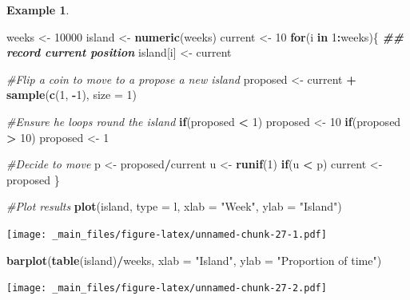 \documentclass[
]{book}
\newenvironment{Shaded}{\begin{snugshade}}{\end{snugshade}}
\newcommand{\AttributeTok}[1]{\textcolor[rgb]{0.13,0.29,0.53}{#1}}
\newcommand{\CommentTok}[1]{\textcolor[rgb]{0.56,0.35,0.01}{\textit{#1}}}
\newcommand{\ControlFlowTok}[1]{\textcolor[rgb]{0.13,0.29,0.53}{\textbf{#1}}}
\newcommand{\DecValTok}[1]{\textcolor[rgb]{0.00,0.00,0.81}{#1}}
\newcommand{\DocumentationTok}[1]{\textcolor[rgb]{0.56,0.35,0.01}{\textbf{\textit{#1}}}}
\newcommand{\FunctionTok}[1]{\textcolor[rgb]{0.13,0.29,0.53}{\textbf{#1}}}
\newcommand{\NormalTok}[1]{#1}
\newcommand{\OtherTok}[1]{\textcolor[rgb]{0.56,0.35,0.01}{#1}}
\newcommand{\SpecialCharTok}[1]{\textcolor[rgb]{0.81,0.36,0.00}{\textbf{#1}}}
\newcommand{\StringTok}[1]{\textcolor[rgb]{0.31,0.60,0.02}{#1}}
\theoremstyle{definition}
\theoremstyle{definition}
\newtheorem{example}{Example}[chapter]
\theoremstyle{definition}
\theoremstyle{definition}
\theoremstyle{remark}
\begin{document}
\begin{example}
\begin{Shaded}
\begin{Highlighting}[]
\NormalTok{weeks }\OtherTok{\textless{}{-}} \DecValTok{10000}
\NormalTok{island }\OtherTok{\textless{}{-}} \FunctionTok{numeric}\NormalTok{(weeks)}
\NormalTok{current }\OtherTok{\textless{}{-}} \DecValTok{10}
\ControlFlowTok{for}\NormalTok{(i }\ControlFlowTok{in} \DecValTok{1}\SpecialCharTok{:}\NormalTok{weeks)\{}
  \DocumentationTok{\#\# record current position}
\NormalTok{  island[i] }\OtherTok{\textless{}{-}}\NormalTok{ current}
  
  \CommentTok{\#Flip a coin to move to a propose a new island}
\NormalTok{  proposed }\OtherTok{\textless{}{-}}\NormalTok{ current }\SpecialCharTok{+} \FunctionTok{sample}\NormalTok{(}\FunctionTok{c}\NormalTok{(}\DecValTok{1}\NormalTok{, }\SpecialCharTok{{-}}\DecValTok{1}\NormalTok{), }\AttributeTok{size =} \DecValTok{1}\NormalTok{)}
  
  \CommentTok{\#Ensure he loops round the island}
  \ControlFlowTok{if}\NormalTok{(proposed }\SpecialCharTok{\textless{}} \DecValTok{1}\NormalTok{) }
\NormalTok{    proposed }\OtherTok{\textless{}{-}} \DecValTok{10}
  \ControlFlowTok{if}\NormalTok{(proposed }\SpecialCharTok{\textgreater{}} \DecValTok{10}\NormalTok{)}
\NormalTok{    proposed }\OtherTok{\textless{}{-}} \DecValTok{1}
  
  \CommentTok{\#Decide to move}
\NormalTok{  p }\OtherTok{\textless{}{-}}\NormalTok{ proposed}\SpecialCharTok{/}\NormalTok{current}
\NormalTok{  u }\OtherTok{\textless{}{-}} \FunctionTok{runif}\NormalTok{(}\DecValTok{1}\NormalTok{)}
  \ControlFlowTok{if}\NormalTok{(u }\SpecialCharTok{\textless{}}\NormalTok{ p)}
\NormalTok{    current }\OtherTok{\textless{}{-}}\NormalTok{ proposed}
\NormalTok{\}}

\CommentTok{\#Plot results}
\FunctionTok{plot}\NormalTok{(island, }\AttributeTok{type =} \StringTok{\textquotesingle{}l\textquotesingle{}}\NormalTok{, }\AttributeTok{xlab =} \StringTok{"Week"}\NormalTok{, }\AttributeTok{ylab =} \StringTok{"Island"}\NormalTok{)}
\end{Highlighting}
\end{Shaded}

\texttt{[image: \_main\_files/figure-latex/unnamed-chunk-27-1.pdf]}

\begin{Shaded}
\begin{Highlighting}[]
\FunctionTok{barplot}\NormalTok{(}\FunctionTok{table}\NormalTok{(island)}\SpecialCharTok{/}\NormalTok{weeks, }\AttributeTok{xlab =} \StringTok{"Island"}\NormalTok{, }
        \AttributeTok{ylab =} \StringTok{"Proportion of time"}\NormalTok{)}
\end{Highlighting}
\end{Shaded}

\texttt{[image: \_main\_files/figure-latex/unnamed-chunk-27-2.pdf]}
\end{example}
\end{document}
